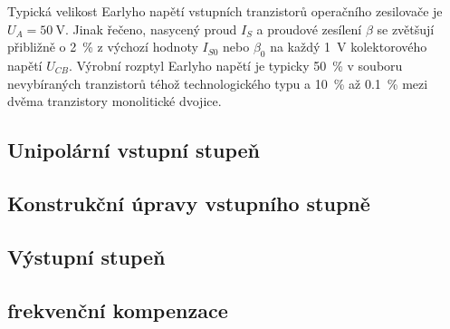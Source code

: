         Typická velikost Earlyho napětí vstupních tranzistorů operačního zesilovače je \(U_A=
        \SI{50}{\V}\). Jinak řečeno, nasycený proud \(I_S\) a proudové zesílení \(\beta\) se
        zvětšují přibližně o \SI{2}{\percent} z výchozí hodnoty \(I_{S0}\) nebo \(\beta_0\) na každý
        \SI{1}{\V} kolektorového napětí \(U_{CB}\). Výrobní rozptyl Earlyho napětí je typicky
        \SI{50}{\percent} v souboru nevybíraných tranzistorů téhož technologického typu a
        \SI{10}{\percent} až \SI{0.1}{\percent} mezi dvěma tranzistory monolitické dvojice.

    \subsection{Unipolární vstupní stupeň}\label{aesIchIIIsecIIIssecII}
    \subsection{Konstrukční úpravy vstupního stupně}\label{aesIchIIIsecIIIssecIII}
    \subsection{Výstupní stupeň}\label{aesIchIIIsecIIIssecIV}
    \subsection{frekvenční kompenzace}\label{aesIchIIIsecIIIssecV}

